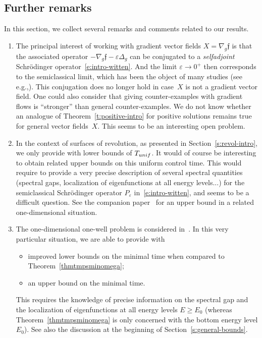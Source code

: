\documentclass[11pt]{article}
\newcommand{\eg}{e.g.,\xspace}
\numberwithin{equation}{section}
\newcommand{\unif}{\textup{unif}}
\theoremstyle{definition}
\newcommand{\f}{\ensuremath{\mathfrak{f}}}
\newcommand\nablag{\nabla_{g}}
\let\eps\varepsilon
\begin{document}
\subsection{Further remarks}
In this section, we collect several remarks and comments related to our results.
\begin{enumerate}
\item The principal interest of working with gradient vector fields $X=\nablag\f$ is that the associated operator $-\nablag\f-\eps\Delta_g$ can be conjugated to a {\em selfadjoint} Schrödinger operator~\eqref{e:intro-witten}.
And the limit $\eps\to 0^+$ then corresponds to the semiclassical limit, which has been the object of many studies (see \eg \cite{Witten:82,Simon:83,HS84,HS:85,Helffer:booksemiclassic,CFKS,Allibert:98,HKN:04,HN:06}).
This conjugation does no longer hold in case~$X$ is not a gradient vector field.
One could also consider that giving counter-examples with gradient flows is ``stronger'' than general counter-examples.
We do not know whether an analogue of Theorem~\ref{t:positive-intro} for positive solutions remains true for general vector fields~$X$. This seems to be an interesting open problem.

\item In the context of surfaces of revolution, as presented in Section~\ref{s:revol-intro}, we only provide with lower bounds of $T_{\unif}$. It would of course be interesting to obtain related upper bounds on this uniform control time. This would require to provide a very precise description of several spectral quantities (spectral gaps, localization of eigenfunctions at all energy levels...) for the semiclassical Schrödinger operator $P_\eps$ in~\eqref{e:intro-witten}, and seems to be a difficult question.
See the companion paper~\cite{LL:20-1D} for an upper bound in a related one-dimensional situation.

\item The one-dimensional one-well problem is considered in~\cite{LL:20-1D}. In this very particular situation, we are able to provide with
\begin{itemize}
\item improved lower bounds on the minimal time when compared to Theorem~\ref{thmtmpsminomega};
\item an upper bound on the minimal time.
\end{itemize}
This requires the knowledge of precise information on the spectral gap and the localization of eigenfunctions at all energy levels $E\geq E_0$ (whereas Theorem~\ref{thmtmpsminomega} is only concerned with the bottom energy level $E_0$). See also the discussion at the beginning of Section~\ref{s:general-bounds}.


\end{enumerate}
\end{document}
